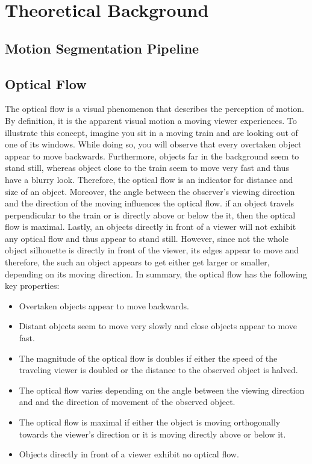 \chapter{Theoretical Background}


\section{Motion Segmentation Pipeline}

\section{Optical Flow}
The optical flow is a visual phenomenon that describes the perception of motion.
By definition, it is the apparent visual motion a moving viewer experiences. To illustrate this concept, imagine you sit in a moving train and are looking out of one of its windows. While doing so, you will observe that every overtaken object appear to move backwards. Furthermore, objects far in the background seem to stand still, whereas object close to the train seem to move very fast and thus have a blurry look. Therefore, the optical flow is an indicator for distance and size of an object. Moreover, the angle between the observer's viewing direction and the direction of the moving influences the optical flow. if an object travels perpendicular to the train or is directly above or below the it, then the optical flow is maximal. Lastly, an objects directly in front of a viewer will not exhibit any optical flow and thus appear to stand still. However, since not the whole object silhouette is directly in front of the viewer, its edges appear to move and therefore, the such an object appears to get either get larger or smaller, depending on its moving direction.
In summary, the optical flow has the following key properties:
\begin{itemize}
  \item Overtaken objects appear to move backwards.
  \item Distant objects seem to move very slowly and close objects appear to move fast.
  \item The magnitude of the optical flow is doubles if either the speed of the traveling viewer is doubled or the distance to the observed object is halved.
  \item The optical flow varies depending on the angle between the viewing direction and and the direction of movement of the observed object.
  \item The optical flow is maximal if either the object is moving orthogonally towards the viewer's direction or it is moving directly above or below it.
  \item Objects directly in front of a viewer exhibit no optical flow.
\end{itemize}

